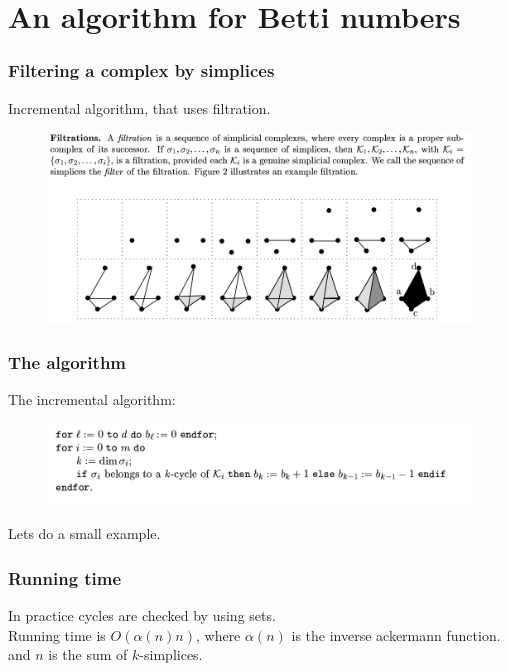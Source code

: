 \documentclass[10pt, compress]{beamer}
\begin{document}

\section{An algorithm for Betti numbers}
\begin{frame}[fragile]
    \frametitle{Filtering a complex by simplices}
    Incremental algorithm, that uses filtration.
    \begin{figure}
        \centering
        \includegraphics[width=1.0\textwidth]{fig/filtering.png}
    \end{figure}
\end{frame}
\begin{frame}[fragile]
    \frametitle{The algorithm}
    The incremental algorithm:
    \begin{figure}
        \centering
        \includegraphics[width=1.0\textwidth]{fig/betti_algo.png}
    \end{figure}
    Lets do a small example.
\end{frame}
\begin{frame}[fragile]
    \frametitle{Running time}
    In practice cycles are checked by using sets.\\
    Running time is $O(\alpha(n)n)$, where $\alpha(n)$ is the inverse
    ackermann function. and $n$ is the sum of $k$-simplices.
\end{frame}
\end{document}
